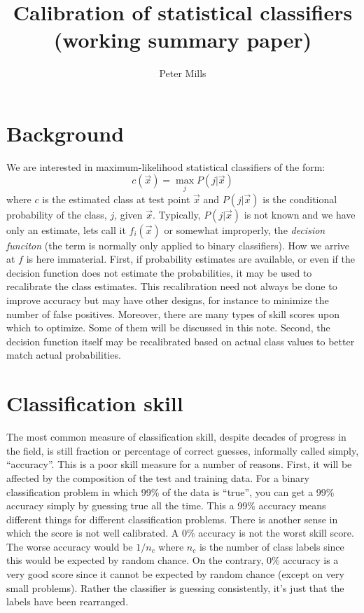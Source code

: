 \documentclass{article}
\begin{document}
\title{Calibration of statistical classifiers\\
(working summary paper)}


\author{Peter Mills\\}

\maketitle

\section{Background}

We are interested in maximum-likelihood statistical classifiers of the form:
\begin{equation}
	c(\vec x)=\max_j P(j|\vec x)
\end{equation}
where $c$ is the estimated class at test point $\vec x$ and
$P(j|\vec x)$ is the conditional probability of the class, $j$,
given $\vec x$.
Typically, $P(j|\vec x)$ is not known and we have only an estimate, 
lets call it $f_i(\vec x)$ or somewhat improperly, the {\it decision funciton}
(the term is normally only applied to binary classifiers).
How we arrive at $f$ is here immaterial. 
First, if probability estimates are available, or even if the decision function
does not estimate the probabilities, it may be used to recalibrate the class
estimates.
This recalibration need not always be done to improve accuracy but may have
other designs, for instance to minimize the number of false positives.
Moreover, there are many types of skill scores upon which to optimize.
Some of them will be discussed in this note.
Second, the decision function itself may be recalibrated based on
actual class values to better match actual probabilities.

\section{Classification skill}


The most common measure of classification skill, despite decades of progress
in the field, is still fraction or percentage of correct guesses, informally
called simply, ``accuracy''.
This is a poor skill measure for a number of reasons.
First, it will be affected by the composition of the test and training data.
For a binary classification problem in which 99\% of the data is ``true'',
you can get a 99\% accuracy simply by guessing true all the time.
This a 99\% accuracy means different things for different classification
problems.
There is another sense in which the score is not well calibrated.
A 0\% accuracy is not the worst skill score.
The worse accuracy would be $1/n_c$ where $n_c$ is the number of class labels
since this would be expected by random chance.
On the contrary, 0\% accuracy is a very good score since it cannot be 
expected by random chance (except on very small problems).
Rather the classifier is guessing consistently, it's just that the labels
have been rearranged.
\end{document}
